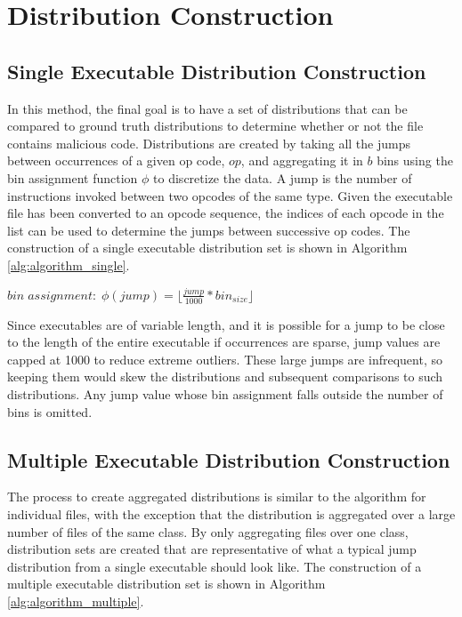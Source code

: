 \section{Distribution Construction}

\subsection{Single Executable Distribution Construction}

In this method, the final goal is to have a set of distributions that can be compared to ground truth distributions to
determine whether or not the file contains malicious code.
Distributions are created by taking all the jumps between occurrences of a given op code, $op$, and aggregating it in
$b$ bins using the bin assignment function $\phi$ to discretize the data.
A jump is the number of instructions invoked between two opcodes of the same type.
Given the executable file has been converted to an opcode sequence, the indices of each opcode in the list can
be used to determine the jumps between successive op codes.
The construction of a single executable distribution set is shown in Algorithm \ref{alg:algorithm_single}.

\begin{center}
    $bin \; assignment:\; \phi(jump) = \lfloor \frac{jump}{1000} * bin_{size} \rfloor$
\end{center}

Since executables are of variable length, and it is possible for a jump to be close to the length of the entire
executable if occurrences are sparse, jump values are capped at 1000 to reduce extreme outliers.
These large jumps are infrequent, so keeping them would skew the distributions and subsequent comparisons to
such distributions.
Any jump value whose bin assignment falls outside the number of bins is omitted.



\subsection{Multiple Executable Distribution Construction}
The process to create aggregated distributions is similar to the algorithm for individual files, with the exception that
the distribution is aggregated over a large number of files of the same class.
By only aggregating files over one class, distribution sets are created that are representative of what a typical
jump distribution from a single executable should look like.
The construction of a multiple executable distribution set is shown in Algorithm \ref{alg:algorithm_multiple}.

